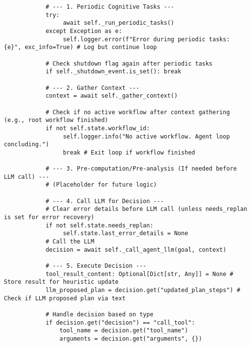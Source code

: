\documentclass[12pt,a4paper]{article}
\begin{document}
\begin{pageablecode}
\begin{verbatim}
            # --- 1. Periodic Cognitive Tasks ---
            try:
                 await self._run_periodic_tasks()
            except Exception as e:
                 self.logger.error(f"Error during periodic tasks: {e}", exc_info=True) # Log but continue loop

            # Check shutdown flag again after periodic tasks
            if self._shutdown_event.is_set(): break

            # --- 2. Gather Context ---
            context = await self._gather_context()

            # Check if no active workflow after context gathering (e.g., root workflow finished)
            if not self.state.workflow_id:
                 self.logger.info("No active workflow. Agent loop concluding.")
                 break # Exit loop if workflow finished

            # --- 3. Pre-computation/Pre-analysis (If needed before LLM call) ---
            # (Placeholder for future logic)

            # --- 4. Call LLM for Decision ---
            # Clear error details before LLM call (unless needs_replan is set for error recovery)
            if not self.state.needs_replan:
                 self.state.last_error_details = None
            # Call the LLM
            decision = await self._call_agent_llm(goal, context)

            # --- 5. Execute Decision ---
            tool_result_content: Optional[Dict[str, Any]] = None # Store result for heuristic update
            llm_proposed_plan = decision.get("updated_plan_steps") # Check if LLM proposed plan via text

            # Handle decision based on type
            if decision.get("decision") == "call_tool":
                tool_name = decision.get("tool_name")
                arguments = decision.get("arguments", {})


\end{verbatim}
\end{pageablecode}
\end{document}
